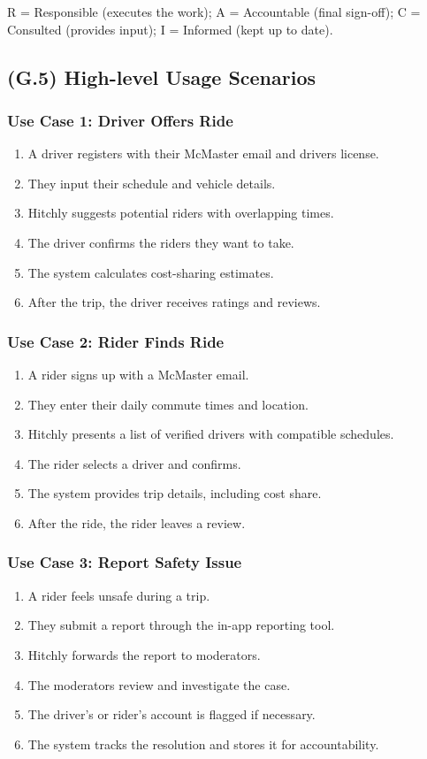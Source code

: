 \documentclass[12pt,letterpaper]{article}
\begin{document}
 R = Responsible (executes the work); A = Accountable (final sign-off); C = Consulted (provides input); I = Informed (kept up to date).

\subsection{(G.5) High-level Usage Scenarios}
\label{sec:goals5}

\subsubsection*{Use Case 1: Driver Offers Ride}
\begin{enumerate}
    \item A driver registers with their McMaster email and drivers license.
    \item They input their schedule and vehicle details.
    \item Hitchly suggests potential riders with overlapping times.
    \item The driver confirms the riders they want to take.
    \item The system calculates cost-sharing estimates.
    \item After the trip, the driver receives ratings and reviews.
\end{enumerate}

\subsubsection*{Use Case 2: Rider Finds Ride}
\begin{enumerate}
    \item A rider signs up with a McMaster email.
    \item They enter their daily commute times and location.
    \item Hitchly presents a list of verified drivers with compatible schedules.
    \item The rider selects a driver and confirms.
    \item The system provides trip details, including cost share.
    \item After the ride, the rider leaves a review.
\end{enumerate}

\subsubsection*{Use Case 3: Report Safety Issue}
\begin{enumerate}
    \item A rider feels unsafe during a trip.
    \item They submit a report through the in-app reporting tool.
    \item Hitchly forwards the report to moderators.
    \item The moderators review and investigate the case.
    \item The driver’s or rider’s account is flagged if necessary.
    \item The system tracks the resolution and stores it for accountability.
\end{enumerate}
\end{document}
